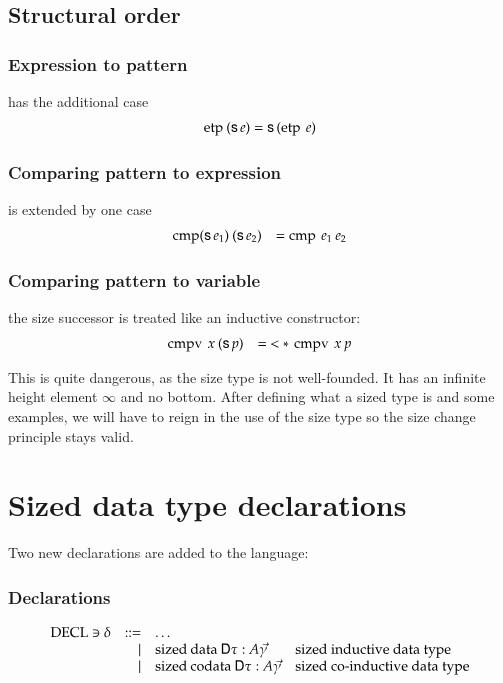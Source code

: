 \subsection{Structural order}

\subsubsection{Expression to pattern}
has the additional case
\[
\begin{array}[t]{ll}
\operatorname{etp}\: (\mathsf{s}\, e) = \mathsf{s}\, (\operatorname{etp}\: e) \\
\end{array}
\]

\subsubsection{Comparing pattern to expression}
is extended by one case
\[
\begin{array}[t]{ll}
\operatorname{cmp} (\mathsf{s}\, e_1) \: (\mathsf{s}\, e_2) & = \operatorname{cmp} \: e_1 \: e_2 \\
\end{array}
\]

\subsubsection{Comparing pattern to variable}
the size successor is treated like an inductive constructor:
\[
\begin{array}[t]{ll}
\operatorname{cmpv} \: x \: (\mathsf{s}\, p) & = \: < * \: \operatorname{cmpv} \: x \: p\\
\end{array}
\]

This is quite dangerous, as the size type is not well-founded.
It has an infinite height element $\infty$ and no bottom. 
After defining what a sized type is and some examples, we will have to reign in the use of the size type
so the size change principle stays valid.

\section{Sized data type declarations}

\newcommand{\sizecon}[4]{#1\vdash#2\mbox{ \textbf{sizeCon} }#3\:#4}
\newcommand{\sizeuse}[4]{#1\vdash#2\mbox{ \textbf{sizeUse} }#3\:#4}

Two new declarations are added to the language:
\subsubsection{Declarations}
\[
\begin{array}{lrll}
\operatorname{DECL} \ni \delta & ::= & \ldots & \\
& \mid & \mathrm{sized}\: \mathrm{data}\: \mathsf{D} \tau : A \vec{\gamma} & \mbox{sized inductive data type}\\ 
& \mid & \mathrm{sized}\: \mathrm{codata}\: \mathsf{D} \tau : A \vec{\gamma} & \mbox{sized co-inductive data type} \\
\end{array}
\]

